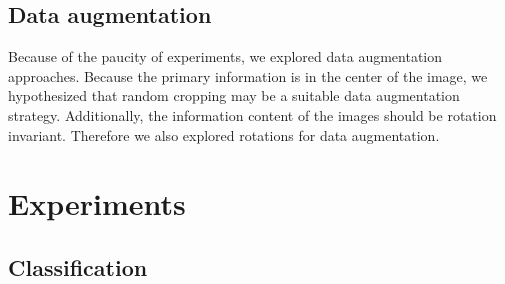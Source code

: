 \documentclass[10pt,twocolumn,letterpaper]{article}
\begin{document}
\subsection{Data augmentation}

Because of the paucity of experiments, we explored data augmentation approaches.  Because the primary information is in the center of the image, we hypothesized that random cropping may be a suitable data augmentation strategy.  Additionally, the information content of the images should be rotation invariant.   Therefore we also explored rotations for data augmentation.



 \section{Experiments}
 
 \subsection{Classification}
 
\end{document}
